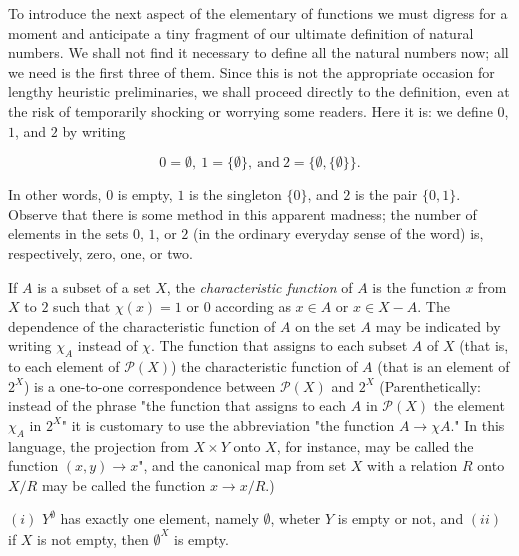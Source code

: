 To introduce the next aspect of the elementary of functions we must digress for a moment and anticipate a tiny fragment of our ultimate definition of natural numbers. We shall not find it necessary to define all the natural numbers now; all we need is the first three of them. Since this is not the appropriate occasion for lengthy heuristic preliminaries, we shall proceed directly to the definition, even at the risk of temporarily shocking or worrying some readers. Here it is: we define  $0$, $1$, and $2$ by writing 

\begin{equation*}
0 = \emptyset , \: 1=\{ \emptyset \} , \: \text{and} \: 2 = \{ \emptyset , \{ \emptyset \} \} . 
\end{equation*}

In other words, $0$ is empty, $1$ is the singleton $\{ 0 \}$, and $2$ is the pair $ \{ 0, 1 \}$. Observe that there is some method in this apparent madness; the number of elements in the sets $0$, $1$, or $2$ (in the ordinary everyday sense of the word) is, respectively, zero, one, or two.   

If $A$ is a subset of a set $X$, the \textit{characteristic function} of $A$ is the function $x$ from $X$ to $2$ such that $\chi (x) = 1$ or $0$ according as $x \in A$ or $x \in X - A$. The dependence of the characteristic function of $A$ on the set $A$ may be indicated by writing $\chi_{A}$ instead of $\chi$. The function that assigns to each subset $A$ of $X$ (that is, to each element of $\mathcal{P}(X)$) the characteristic function of $A$ (that is an element of $2^{X}$) is a one-to-one correspondence between $\mathcal{P}(X)$ and $2^{X}$ (Parenthetically: instead of the phrase "the function that assigns to each $A$ in $\mathcal{P}(X)$ the element $\chi_{A}$ in $2^{X}$" it is customary to use the abbreviation "the function $A \rightarrow \chi{A}$." In this language, the projection from $X \times Y$ onto $X$, for instance, may be called the function $(x, y) \rightarrow x$", and the canonical map from set $X$ with a relation $R$ onto $X/R$ may be called the function $x \rightarrow x/R$.) 

\begin{exercise} $(i)$ $Y^{\emptyset}$ has exactly one element, namely $\emptyset$, wheter $Y$ is empty or not, and $(ii)$ if $X$ is not empty, then $\emptyset^{X}$ is empty.

\end{exercise}